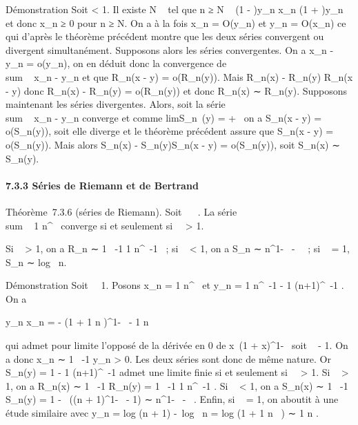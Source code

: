 \documentclass[]{article}
\begin{document}
Démonstration Soit \epsilon \textless{} 1. Il existe N \in {}~ tel que n ≥ N \rigtharrow~ (1 -
\epsilon)y\_n \leq x\_n \leq (1 + \epsilon)y\_n et donc x\_n
≥ 0 pour n ≥ N. On a à la fois x\_n = O(y\_n) et
y\_n = O(x\_n) ce qui d'après le théorème précédent
montre que les deux séries convergent ou divergent simultanément.
Supposons alors les séries convergentes. On a \textbar{}x\_n -
y\_n\textbar{} = o(y\_n), on en déduit donc la
convergence de \\sum ~
\textbar{}x\_n - y\_n\textbar{} et que
R\_n(\textbar{}x - y\textbar{}) = o(R\_n(y)). Mais
\textbar{}R\_n(x) - R\_n(y)\textbar{}\leq
R\_n(\textbar{}x - y\textbar{}) donc \textbar{}R\_n(x) -
R\_n(y)\textbar{} = o(R\_n(y)) et donc R\_n(x) ∼
R\_n(y). Supposons maintenant les séries divergentes. Alors,
soit la série \\sum ~
\textbar{}x\_n - y\_n\textbar{} converge et comme
limS\_n~(y) = +\infty~ on a
S\_n(\textbar{}x - y\textbar{}) = o(S\_n(y)), soit elle
diverge et le théorème précédent assure que S\_n(\textbar{}x -
y\textbar{}) = o(S\_n(y)). Mais alors \textbar{}S\_n(x)
- S\_n(y)\textbar{}\leq S\_n(\textbar{}x - y\textbar{}) =
o(S\_n(y)), soit S\_n(x) ∼ S\_n(y).

\paragraph{7.3.3 Séries de Riemann et de Bertrand}

Théorème~7.3.6 (séries de Riemann). Soit \alpha~ \in {}~. La série
\\sum ~  1
\over n^\alpha~ converge si et seulement si~\alpha~
\textgreater{} 1.

Si \alpha~ \textgreater{} 1, on a R\_n ∼ 1 \over
\alpha~-1  1 \over n^\alpha~-1 ~; si \alpha~ \textless{}
1, on a S\_n ∼ n^1-\alpha~ -\alpha~ ~;
si \alpha~ = 1, S\_n ∼ log~ n.

Démonstration Soit \alpha~\neq~1. Posons x\_n
= 1 \over n^\alpha~ et y\_n = 1
\over n^\alpha~-1 - 1 \over
(n+1)^\alpha~-1 . On a

 y\_n \over x\_n = - (1 + 1
\over n )^1-\alpha~ - 1 
\over n 

qui admet pour limite l'opposé de la dérivée en 0 de
x\mapsto~(1 + x)^1-\alpha~ soit \alpha~ - 1. On a
donc x\_n ∼ 1 \over \alpha~-1 y\_n
\textgreater{} 0. Les deux séries sont donc de même nature. Or
S\_n(y) = 1 - 1 \over (n+1)^\alpha~-1
admet une limite finie si et seulement si~\alpha~ \textgreater{} 1. Si \alpha~
\textgreater{} 1, on a R\_n(x) ∼ 1 \over \alpha~-1
R\_n(y) = 1 \over \alpha~-1  1
\over n^\alpha~-1 . Si \alpha~ \textless{} 1, on a
S\_n(x) ∼ 1 \over \alpha~-1 S\_n(y) = 1
-\alpha~ ((n + 1)^1-\alpha~ - 1) ∼
n^1-\alpha~ -\alpha~ . Enfin, si \alpha~ = 1, on
aboutit à une étude similaire avec y\_n
= log (n + 1) -\ log~
n = log (1 + 1 \over n~ )
∼ 1 \over n .
\end{document}
